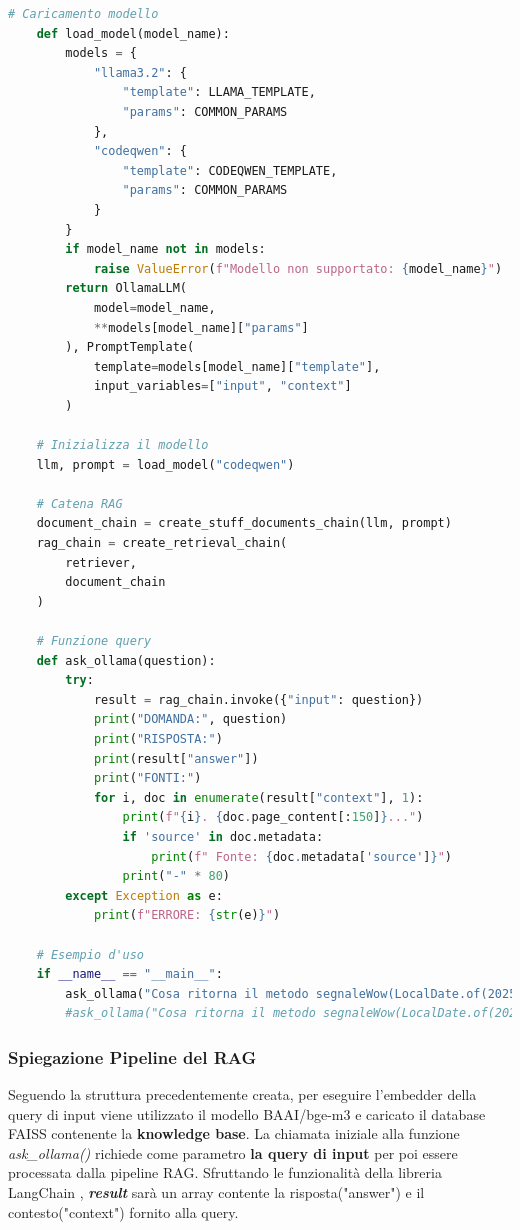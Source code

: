 \documentclass[12pt,a4paper,openright,twoside]{book}
\begin{document}
\begin{lstlisting}[language=Python, caption={Pipeline RAG}, label={lst:rag}]
    # Caricamento modello
    def load_model(model_name):
        models = {
            "llama3.2": {
                "template": LLAMA_TEMPLATE,
                "params": COMMON_PARAMS
            },
            "codeqwen": {
                "template": CODEQWEN_TEMPLATE,
                "params": COMMON_PARAMS
            }
        }
        if model_name not in models:
            raise ValueError(f"Modello non supportato: {model_name}")
        return OllamaLLM(
            model=model_name,
            **models[model_name]["params"]
        ), PromptTemplate(
            template=models[model_name]["template"],
            input_variables=["input", "context"]
        )
    
    # Inizializza il modello
    llm, prompt = load_model("codeqwen")
    
    # Catena RAG
    document_chain = create_stuff_documents_chain(llm, prompt)
    rag_chain = create_retrieval_chain(
        retriever,
        document_chain
    )
    
    # Funzione query
    def ask_ollama(question):
        try:
            result = rag_chain.invoke({"input": question})
            print("DOMANDA:", question)
            print("RISPOSTA:")
            print(result["answer"])
            print("FONTI:")
            for i, doc in enumerate(result["context"], 1):
                print(f"{i}. {doc.page_content[:150]}...")
                if 'source' in doc.metadata:
                    print(f" Fonte: {doc.metadata['source']}")
                print("-" * 80)
        except Exception as e:
            print(f"ERRORE: {str(e)}")
    
    # Esempio d'uso
    if __name__ == "__main__":
        ask_ollama("Cosa ritorna il metodo segnaleWow(LocalDate.of(2025, 2, 14)) che utilizza la funzione getMessaggioMagico() della libreria DateUtilCustom?")
        #ask_ollama("Cosa ritorna il metodo segnaleWow(LocalDate.of(2025, 2, 14))?")
\end{lstlisting}
\subsubsection{Spiegazione Pipeline del RAG}
    Seguendo la struttura precedentemente creata, per eseguire l'embedder della query di input viene utilizzato il modello BAAI/bge-m3 e
    caricato il database FAISS contenente la \textbf{knowledge base}.
    La chiamata iniziale alla funzione \emph{ask\_ollama()} richiede come parametro \textbf{la query di input} per poi essere processata dalla pipeline RAG.
    Sfruttando le funzionalità della libreria LangChain \cite{langchain-retrieval-chain}, \textbf{\emph{result}} sarà un array contente la risposta("answer") e il contesto("context") fornito alla query.
\end{document}
